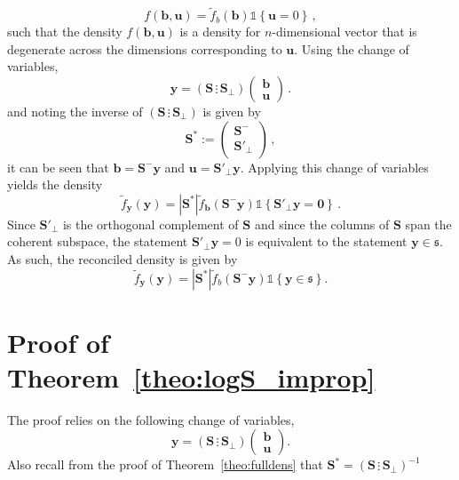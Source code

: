 \documentclass[12pt]{article}
\theoremstyle{definition}
\begin{document}
\begin{equation}
f(\bm{b},\bm{u})=\tilde{f}_b(\bm{b})\mathbb{1}\left\{\bm{u}=0\right\}\,,
\end{equation}
such that the density $f(\bm{b},\bm{u})$ is a density for $n$-dimensional vector that is degenerate across the dimensions corresponding to $\bm{u}$.  Using the change of variables,
\[
\bm{y}=\left(\bm{S}\,\vdots\,\bm{S}_{\perp}\right)\begin{pmatrix}\bm{b}\\\bm{u}
\end{pmatrix}\,.
\]
and noting the inverse of $\left(\bm{S}\,\vdots\,\bm{S}_{\perp}\right)$ is given by
\[
\bm{S}^*:=\begin{pmatrix}\bm{S}^{-}\\\bm{S}'_{\perp}\end{pmatrix}\,,
\]
it can be seen that $\bm{b}=\bm{S}^-\bm{y}$ and $\bm{u}=\bm{S}'_\perp\bm{y}$.  Applying this change of variables yields the density
\[
\tilde{f}_{\bm{y}}(\bm{y})=|\bm{S}^*|\tilde{f}_{\bm b}(\bm{S}^-\bm{y})\mathbb{1}\left\{\bm{S}'_\perp\bm{y}=\bm{0}\right\}\,.
\]
Since $\bm{S}'_\perp$ is the orthogonal complement of $\bm{S}$ and since the columns of $\bm{S}$ span the coherent subspace, the statement $\bm{S}'_\perp\bm{y}=0$ is equivalent to the statement $\bm{y}\in\mathfrak{s}$.  As such, the reconciled density is given by
\[
\tilde{f}_{\bm{y}}(\bm{y})=|\bm{S}^*|\tilde{f}_b(\bm{S}^-\bm{y})\mathbb{1}\left\{\bm{y}\in\mathfrak{s}\right\}.
\]

\section{Proof of Theorem~\ref{theo:logS_improp}}\label{Appen:logS_improp}

The proof relies on the following change of variables,
\[
\bm{y}=\left(\bm{S}\,\vdots\,\bm{S_\perp}\right)\begin{pmatrix}\bm{b}\\\bm{u}\end{pmatrix}.
\]
Also recall from the proof of Theorem~\ref{theo:fulldens} that $\bm{S}^*=\left(\bm{S}\,\vdots\,\bm{S_\perp}\right)^{-1}$
\end{document}
